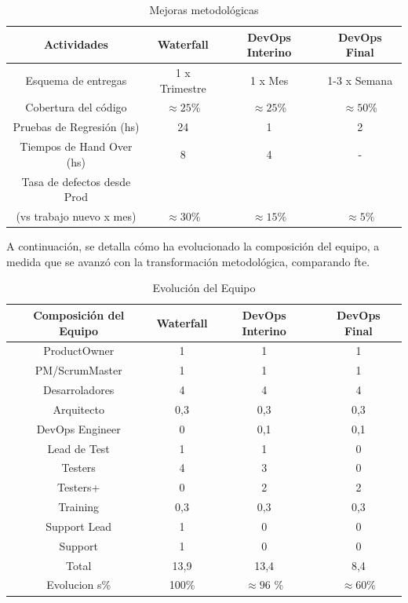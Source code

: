 \begin{table} 
    \centering
    \begin{tabular}{|c|c|c|c|}\hline
        \textbf{Actividades}&  \textbf{Waterfall}&  \textbf{DevOps Interino}&  \textbf{DevOps Final}\\\hline
         Esquema de entregas&  1 x Trimestre &  1 x Mes & 1-3 x Semana  \\\hline
         Cobertura del código& $\approx 25$\% &  $\approx 25$\%&  $\approx 50$\%\\\hline
         Pruebas de Regresión (hs)&  24&  1&  2\\\hline
         Tiempos de Hand Over (hs)& 8&  4&  -\\\hline
         Tasa de defectos desde Prod\\ (vs trabajo nuevo x mes)&  $\approx 30$\%&  $\approx 15$\%&  $\approx 5$\%\\\hline
    \end{tabular}
    \caption{Mejoras metodológicas}
    \label{tab:water_to_devops_method}
\end{table}

A continuación, se detalla cómo ha evolucionado la composición del equipo, a medida que se avanzó con la transformación metodológica, comparando \gls{fte}.

\begin{table}
    \centering
    \begin{tabular}{|c|c|c|c|}\hline
        \textbf{Composición del Equipo}&  \textbf{Waterfall}&  \textbf{DevOps Interino}&  \textbf{DevOps Final}\\\hline
         ProductOwner&  1 &  1 & 1  \\\hline
         PM/ScrumMaster& 1 &  1&  1\\\hline
         Desarroladores&  4&  4&  4\\\hline
         Arquitecto& 0,3&  0,3&  0,3\\\hline
         DevOps Engineer& 0&  0,1&  0,1\\\hline
         Lead de Test& 1&  1&  0\\\hline
         Testers& 4&  3&  0\\\hline
         Testers+& 0&  2&  2\\\hline
         Training& 0,3&  0,3&  0,3\\\hline
         Support Lead& 1&  0&  0\\\hline
         Support& 1&  0&  0\\\hline
         Total & 13,9&  13,4&  8,4\\\hline         
         Evolucion s\% & 100\%& $\approx 96$ \% &  $\approx 60$\%\\\hline         
        \end{tabular}
    \caption{Evolución del Equipo}
    \label{tab:water_to_devops_team}
\end{table}
